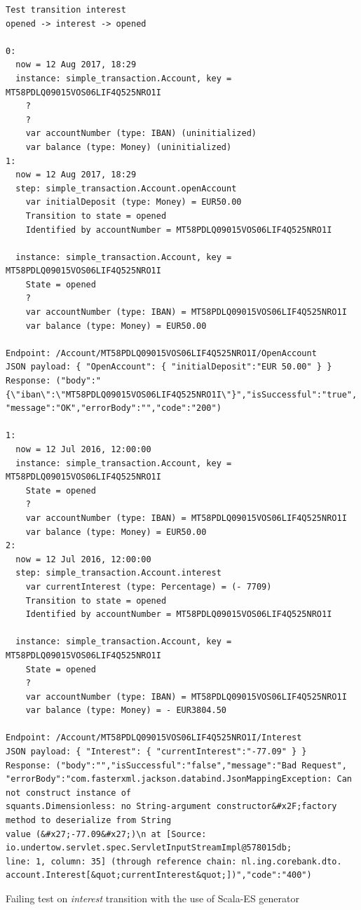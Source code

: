 \begin{sourcecode}[h!]
\begin{lstlisting}[]
Test transition interest
opened -> interest -> opened

0:
  now = 12 Aug 2017, 18:29
  instance: simple_transaction.Account, key = MT58PDLQ09015VOS06LIF4Q525NRO1I
    ?
    ?
    var accountNumber (type: IBAN) (uninitialized)
    var balance (type: Money) (uninitialized)
1:
  now = 12 Aug 2017, 18:29
  step: simple_transaction.Account.openAccount
    var initialDeposit (type: Money) = EUR50.00
    Transition to state = opened
    Identified by accountNumber = MT58PDLQ09015VOS06LIF4Q525NRO1I

  instance: simple_transaction.Account, key = MT58PDLQ09015VOS06LIF4Q525NRO1I
    State = opened
    ?
    var accountNumber (type: IBAN) = MT58PDLQ09015VOS06LIF4Q525NRO1I
    var balance (type: Money) = EUR50.00

Endpoint: /Account/MT58PDLQ09015VOS06LIF4Q525NRO1I/OpenAccount
JSON payload: { "OpenAccount": { "initialDeposit":"EUR 50.00" } }
Response: ("body":"{\"iban\":\"MT58PDLQ09015VOS06LIF4Q525NRO1I\"}","isSuccessful":"true",
"message":"OK","errorBody":"","code":"200")

1:
  now = 12 Jul 2016, 12:00:00
  instance: simple_transaction.Account, key = MT58PDLQ09015VOS06LIF4Q525NRO1I
    State = opened
    ?
    var accountNumber (type: IBAN) = MT58PDLQ09015VOS06LIF4Q525NRO1I
    var balance (type: Money) = EUR50.00
2:
  now = 12 Jul 2016, 12:00:00
  step: simple_transaction.Account.interest
    var currentInterest (type: Percentage) = (- 7709)
    Transition to state = opened
    Identified by accountNumber = MT58PDLQ09015VOS06LIF4Q525NRO1I

  instance: simple_transaction.Account, key = MT58PDLQ09015VOS06LIF4Q525NRO1I
    State = opened
    ?
    var accountNumber (type: IBAN) = MT58PDLQ09015VOS06LIF4Q525NRO1I
    var balance (type: Money) = - EUR3804.50

Endpoint: /Account/MT58PDLQ09015VOS06LIF4Q525NRO1I/Interest
JSON payload: { "Interest": { "currentInterest":"-77.09" } }
Response: ("body":"","isSuccessful":"false","message":"Bad Request",
"errorBody":"com.fasterxml.jackson.databind.JsonMappingException: Can not construct instance of
squants.Dimensionless: no String-argument constructor&#x2F;factory method to deserialize from String
value (&#x27;-77.09&#x27;)\n at [Source: io.undertow.servlet.spec.ServletInputStreamImpl@578015db;
line: 1, column: 35] (through reference chain: nl.ing.corebank.dto.
account.Interest[&quot;currentInterest&quot;])","code":"400")
\end{lstlisting}
\caption{Failing test on \textit{interest} transition with the use of Scala-ES generator}\label{fig:result-scalaes-interest}
\end{sourcecode}
\FloatBarrier

